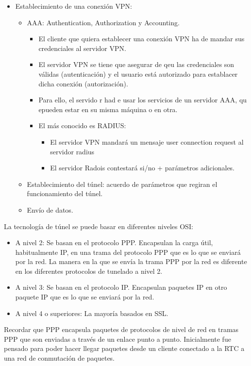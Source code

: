 \documentclass[10pt,portrait, twocolumn]{article}
\begin{document}
	\begin{itemize}
	\item Establecimiento de una conexión VPN:
		\begin{itemize}
		\item AAA: Authentication, Authorization y Accounting.
			\begin{itemize}
			\item El cliente que quiera establecer una conexión VPN ha de mandar sus credenciales al servidor VPN.
			\item El servidor VPN se tiene que asegurar de qeu las credenciales son válidas (autenticación) y el usuario está autorizado para establacer dicha conexión (autorización).
			\item Para ello, el servido r had e usar los servicios de un servidor AAA, qu epueden estar en su misma máquina o en otra.
			\item El más conocido es RADIUS: 
				\begin{itemize}
				\item El servidor VPN mandará un mensaje user connection request al servidor radius
				\item El servidor Radois contestará si/no + parámetros adicionales.
				\end{itemize} 
			\end{itemize}
		\item Establecimiento del túnel: acuerdo de parámetros que regiran el funcionamiento del túnel.
		\item Envío de datos.
		\end{itemize}
	\end{itemize}

La tecnología de túnel se puede basar en diferentes niveles OSI:

	\begin{itemize}
	\item A nivel 2: Se basan en el protocolo PPP. Encapsulan la carga útil, habitualmente IP, en una trama del protocolo PPP que es lo que se enviará por la red. La manera en la que se envía la trama PPP por la red es diferente en los diferentes protocolos de tunelado a nivel 2.
	\item  A nivel 3: Se basan en el protocolo IP. Encapsulan paquetes IP en otro paquete IP que es lo que se enviará por la red.
	\item A nivel 4 o superiores: La mayoría basados en SSL.
	\end{itemize}
	
Recordar que PPP encapsula paquetes de protocolos de nivel de red en tramas PPP que son enviadas a través de un enlace punto a punto. Inicialmente fue pensado para poder hacer llegar paquetes desde un cliente conectado a la RTC a una red de conmutación de paquetes.\\
\end{document}
